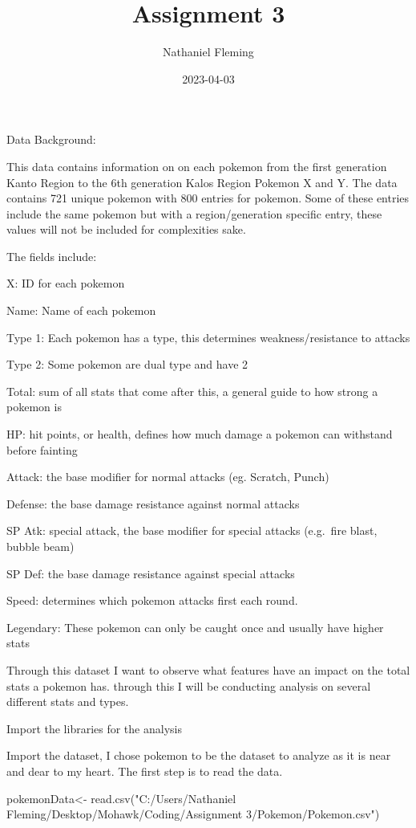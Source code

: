 \documentclass[
]{article}
\title{Assignment 3}
\author{Nathaniel Fleming}
\date{2023-04-03}
\newenvironment{Shaded}{\begin{snugshade}}{\end{snugshade}}
\newcommand{\FunctionTok}[1]{\textcolor[rgb]{0.00,0.00,0.00}{#1}}
\newcommand{\NormalTok}[1]{#1}
\newcommand{\OtherTok}[1]{\textcolor[rgb]{0.56,0.35,0.01}{#1}}
\newcommand{\StringTok}[1]{\textcolor[rgb]{0.31,0.60,0.02}{#1}}
\begin{document}
\maketitle

Data Background:

This data contains information on on each pokemon from the first
generation Kanto Region to the 6th generation Kalos Region Pokemon X and
Y. The data contains 721 unique pokemon with 800 entries for pokemon.
Some of these entries include the same pokemon but with a
region/generation specific entry, these values will not be included for
complexities sake.

The fields include:

X: ID for each pokemon

Name: Name of each pokemon

Type 1: Each pokemon has a type, this determines weakness/resistance to
attacks

Type 2: Some pokemon are dual type and have 2

Total: sum of all stats that come after this, a general guide to how
strong a pokemon is

HP: hit points, or health, defines how much damage a pokemon can
withstand before fainting

Attack: the base modifier for normal attacks (eg. Scratch, Punch)

Defense: the base damage resistance against normal attacks

SP Atk: special attack, the base modifier for special attacks (e.g.~fire
blast, bubble beam)

SP Def: the base damage resistance against special attacks

Speed: determines which pokemon attacks first each round.

Legendary: These pokemon can only be caught once and usually have higher
stats

Through this dataset I want to observe what features have an impact on
the total stats a pokemon has. through this I will be conducting
analysis on several different stats and types.

Import the libraries for the analysis

Import the dataset, I chose pokemon to be the dataset to analyze as it
is near and dear to my heart. The first step is to read the data.

\begin{Shaded}
\begin{Highlighting}[]
\NormalTok{pokemonData}\OtherTok{\textless{}{-}} \FunctionTok{read.csv}\NormalTok{(}\StringTok{"C:/Users/Nathaniel Fleming/Desktop/Mohawk/Coding/Assignment 3/Pokemon/Pokemon.csv"}\NormalTok{)}
\end{Highlighting}
\end{Shaded}
\end{document}
